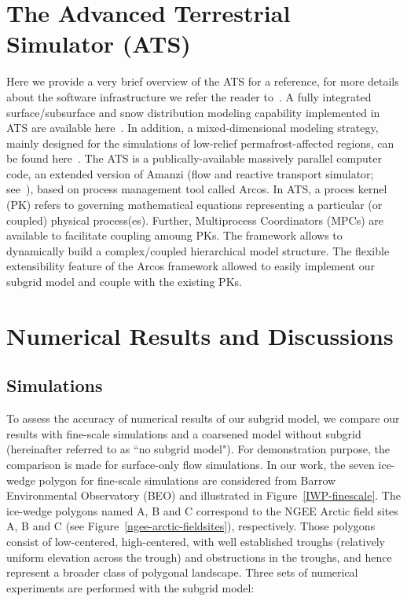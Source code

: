 \documentclass[review,11pt]{elsarticle}
\begin{document}
\section{The Advanced Terrestrial Simulator (ATS)}\label{ATS}
Here we provide a very brief overview of the ATS for a reference, for more details about the software infrastructure we refer the reader to~\cite{ecoon2016managing, ats-website}. A fully integrated surface/subsurface and snow distribution modeling capability implemented in ATS are available here~\cite{spainter2016integrated, atchley2015}. In addition, a mixed-dimensional modeling strategy, mainly designed for the simulations of low-relief permafrost-affected regions, can be found here~\cite{jan2017}. The ATS is a publically-available massively parallel computer code, an extended version of Amanzi (flow and reactive transport simulator; see~\cite{moulton2012high}), based on process management tool called Arcos. In ATS, a proces kernel (PK) refers to governing mathematical equations representing a particular (or coupled) physical process(es). Further, Multiprocess Coordinators (MPCs) are available to facilitate coupling amoung PKs. The framework allows to dynamically build a complex/coupled hierarchical model structure. The flexible extensibility feature of the Arcos framework allowed to easily implement our subgrid model and couple with the existing PKs.

\section{Numerical Results and Discussions}\label{numerical-tests}
\FloatBarrier
\subsection{Simulations}
To assess the accuracy of numerical results of our subgrid model, we compare our results with fine-scale simulations and a coarsened model without subgrid (hereinafter referred to as ``no subgrid model"). For demonstration purpose, the comparison is made for surface-only flow simulations. In our work, the seven ice-wedge polygon for fine-scale simulations are considered from Barrow Environmental Observatory (BEO) and illustrated in Figure~\ref{IWP-finescale}. The ice-wedge polygons named A, B and C correspond to the NGEE Arctic field sites A, B and C (see Figure~\ref{ngee-arctic-fieldsites}), respectively. Those polygons consist of low-centered, high-centered, with well established troughs (relatively uniform elevation across the trough) and obstructions in the troughs, and hence represent a broader class of polygonal landscape. Three sets of numerical experiments are performed with the subgrid model:
\end{document}
